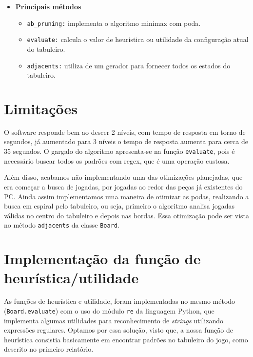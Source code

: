 \documentclass{article}
\begin{document}
\begin{itemize}
	\item \textbf{Principais métodos}
		\begin{itemize}

			\item \texttt{ab\_pruning:} implementa o algoritmo minimax com
			poda.

			\item \texttt{evaluate:} calcula o valor de heurística ou utilidade
			da configuração atual do tabuleiro.

			\item \texttt{adjacents:} utiliza de um gerador para fornecer todos
			os estados do tabuleiro.

		\end{itemize}

\end{itemize}

\section{Limitações}

O software responde bem ao descer 2 níveis, com tempo de resposta em torno de
segundos, já aumentado para 3 níveis o tempo de resposta aumenta para cerca de
35 segundos. O gargalo do algoritmo apresenta-se na função \texttt{evaluate},
pois é necessário buscar todos os padrões com regex, que é uma operação
custosa.

Além disso, acabamos não implementando uma das otimizações planejadas, que era
começar a busca de jogadas, por jogadas ao redor das peças já existentes do PC.
Ainda assim implementamos uma maneira de otimizar as podas, realizando a busca
em espiral pelo tabuleiro, ou seja, primeiro o algoritmo analisa jogadas
válidas no centro do tabuleiro e depois nas bordas. Essa otimização pode ser
vista no método \texttt{adjacents} da classe \texttt{Board}.

\section{Implementação da função de heurística/utilidade}

As funções de heurística e utilidade, foram implementadas no mesmo método
(\texttt{Board.evaluate}) com o uso do módulo \texttt{re} da linguagem Python,
que implementa algumas utilidades para reconhecimento de \textit{strings}
utilizando expressões regulares. Optamos por essa solução, visto que, a nossa
função de heurística consistia basicamente em encontrar padrões no tabuleiro do
jogo, como descrito no primeiro relatório.
\end{document}
